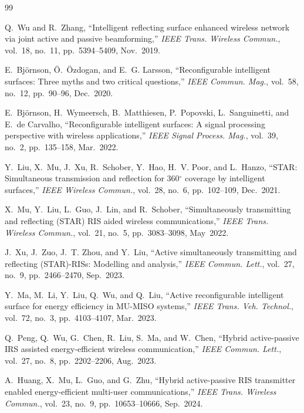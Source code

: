 \documentclass[journal]{IEEEtran}
\begin{document}
\begin{thebibliography}{99}
\setlength{\itemsep}{-0.8pt}
\setlength{\parskip}{0pt}

Q.~Wu and R.~Zhang,
``Intelligent reflecting surface enhanced wireless network via joint active and passive beamforming,''
\emph{IEEE Trans. Wireless Commun.}, vol.~18, no.~11, pp.~5394--5409, Nov.~2019.

E.~Bj{\"o}rnson, {\"O}.~{\"O}zdogan, and E.~G. Larsson,
``Reconfigurable intelligent surfaces: Three myths and two critical questions,''
\emph{IEEE Commun. Mag.}, vol.~58, no.~12, pp.~90--96, Dec.~2020.

E.~Bj{\"o}rnson, H.~Wymeersch, B.~Matthiesen, P.~Popovski, L.~Sanguinetti, and E.~de Carvalho,
``Reconfigurable intelligent surfaces: A signal processing perspective with wireless applications,''
\emph{IEEE Signal Process. Mag.}, vol.~39, no.~2, pp.~135--158, Mar.~2022.

Y.~Liu, X.~Mu, J.~Xu, R.~Schober, Y.~Hao, H.~V. Poor, and L.~Hanzo,
``STAR: Simultaneous transmission and reflection for 360$^\circ$ coverage by intelligent surfaces,''
\emph{IEEE Wireless Commun.}, vol.~28, no.~6, pp.~102--109, Dec.~2021.

X.~Mu, Y.~Liu, L.~Guo, J.~Lin, and R.~Schober,
``Simultaneously transmitting and reflecting (STAR) RIS aided wireless communications,''
\emph{IEEE Trans. Wireless Commun.}, vol.~21, no.~5, pp.~3083--3098, May~2022.

J.~Xu, J.~Zuo, J.~T. Zhou, and Y.~Liu,
``Active simultaneously transmitting and reflecting (STAR)-RISs: Modelling and analysis,''
\emph{IEEE Commun. Lett.}, vol.~27, no.~9, pp.~2466--2470, Sep.~2023.

Y.~Ma, M.~Li, Y.~Liu, Q.~Wu, and Q.~Liu,
``Active reconfigurable intelligent surface for energy efficiency in MU-MISO systems,''
\emph{IEEE Trans. Veh. Technol.}, vol.~72, no.~3, pp.~4103--4107, Mar.~2023.

Q.~Peng, Q.~Wu, G.~Chen, R.~Liu, S.~Ma, and W.~Chen,
``Hybrid active-passive IRS assisted energy-efficient wireless communication,''
\emph{IEEE Commun. Lett.}, vol.~27, no.~8, pp.~2202--2206, Aug.~2023.

A.~Huang, X.~Mu, L.~Guo, and G.~Zhu,
``Hybrid active-passive RIS transmitter enabled energy-efficient multi-user communications,''
\emph{IEEE Trans. Wireless Commun.}, vol.~23, no.~9, pp.~10653--10666, Sep.~2024.


\end{thebibliography}
\end{document}

